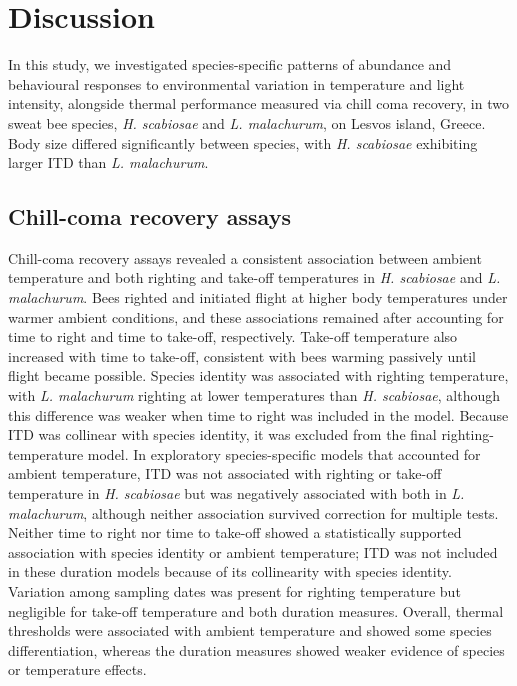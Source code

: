 \documentclass[11pt,a4paper]{article}
\begin{document}
\section{Discussion}

In this study, we investigated species-specific patterns of abundance and behavioural responses to environmental variation in temperature and light intensity, alongside thermal performance measured via chill coma recovery, in two sweat bee species, \textit{H. scabiosae} and \textit{L. malachurum}, on Lesvos island, Greece. Body size differed significantly between species, with \textit{H. scabiosae} exhibiting larger ITD than \textit{L. malachurum}. 

\subsection{Chill-coma recovery assays}

Chill-coma recovery assays revealed a consistent association between ambient temperature and both righting and take-off temperatures in \textit{H. scabiosae} and \textit{L. malachurum}. Bees righted and initiated flight at higher body temperatures under warmer ambient conditions, and these associations remained after accounting for time to right and time to take-off, respectively. Take-off temperature also increased with time to take-off, consistent with bees warming passively until flight became possible.  Species identity was associated with righting temperature, with \textit{L. malachurum} righting at lower temperatures than \textit{H. scabiosae}, although this difference was weaker when time to right was included in the model. Because ITD was collinear with species identity, it was excluded from the final righting-temperature model. In exploratory species-specific models that accounted for ambient temperature, ITD was not associated with righting or take-off temperature in \textit{H. scabiosae} but was negatively associated with both in \textit{L. malachurum}, although neither association survived correction for multiple tests. Neither time to right nor time to take-off showed a statistically supported association with species identity or ambient temperature; ITD was not included in these duration models because of its collinearity with species identity. Variation among sampling dates was present for righting temperature but negligible for take-off temperature and both duration measures. Overall, thermal thresholds were associated with ambient temperature and showed some species differentiation, whereas the duration measures showed weaker evidence of species or temperature effects. 
\end{document}
